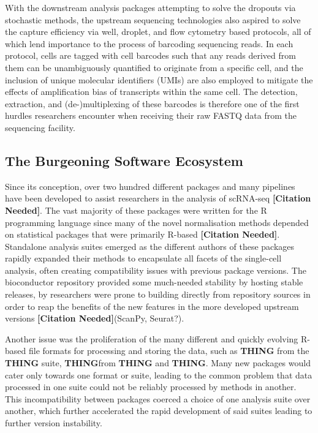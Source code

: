 \documentclass[a4paper,num-refs]{oup-contemporary}
\newcommand{\citeneed}{{\bf\tiny [Citation Needed]}}
\newcommand{\thing}{{\bf THING}}
\begin{document}
With the downstream analysis packages attempting to solve the dropouts via stochastic methods, the upstream sequencing technologies also aspired to solve the capture efficiency via well, droplet, and flow cytometry based protocols, all of which lend importance to the process of barcoding sequencing reads. In each protocol, cells are tagged with cell barcodes such that any reads derived from them can be unambiguously quantified to originate from a specific cell, and the inclusion of unique molecular identifiers (UMIs) are also employed to mitigate the effects of amplification bias of transcripts within the same cell. The detection, extraction, and (de-)multiplexing of these barcodes is therefore one of the first hurdles researchers encounter when receiving their raw FASTQ data from the sequencing facility.

\subsection{The Burgeoning Software Ecosystem}
Since its conception, over two hundred different packages and many pipelines have been developed to assist researchers in the analysis of scRNA-seq \citeneed. The vast majority of these packages were written for the R programming language since many of the novel normalisation methods depended on statistical packages that were primarily R-based \citeneed. Standalone analysis suites emerged as the different authors of these packages rapidly expanded their methods to encapsulate all facets of the single-cell analysis, often creating compatibility issues with previous package versions. The bioconductor repository provided some much-needed stability by hosting stable releases, by researchers were prone to building directly from repository sources in order to reap the benefits of the new features in the more developed upstream versions \citeneed (ScanPy, Seurat?).

Another issue was the proliferation of the many different and quickly evolving R-based file formats for processing and storing the data, such as \thing{} from the \thing{} suite, \thing from \thing{} and \thing{}. Many new packages would cater only towards one format or suite, leading to the common problem that data processed in one suite could not be reliably processed by methods in another. This incompatibility between packages coerced a choice of one analysis suite over another, which further accelerated the rapid development of said suites leading to further version instability.
\end{document}
